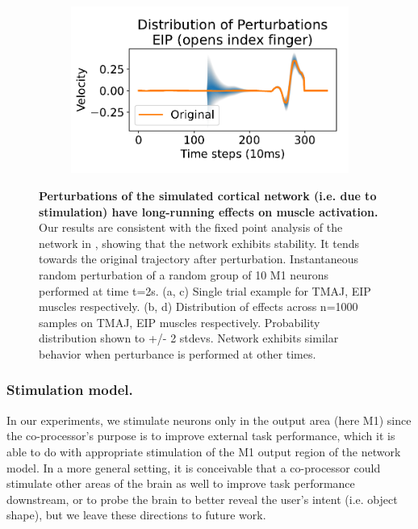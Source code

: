 \documentclass[12pt]{iopart}
\begin{document}
\begin{figure}[h]
\begin{subfigure}[c]{0.48\textwidth}
	    \caption{}
	\end{subfigure}
	\hfill
	\begin{subfigure}[c]{0.48\textwidth}
	    \centering
	    \includegraphics[width=\textwidth]{perturbe_dist_eip.pdf}
	    \caption{}
	\end{subfigure}
	\hfill
	\caption{\textbf{Perturbations of the simulated cortical network (i.e. due to stimulation)
	         have long-running effects on muscle activation.} Our results are consistent with
	         the fixed point analysis of the network in \cite{michaels.mrnn}, showing that the network
	         exhibits stability. It tends towards the original trajectory after perturbation.
	         Instantaneous random perturbation of a random group of 10 M1
	         neurons performed at time t=2s. (a, c) Single trial example for TMAJ, EIP muscles
	         respectively. (b, d) Distribution of effects across n=1000 samples on TMAJ, EIP muscles
	         respectively. Probability distribution shown to +/- 2 stdevs. Network exhibits similar
	         behavior when perturbance is performed at other times.}
	\label{fig:dynamics}
\end{figure}

\subsubsection{Stimulation model.}
In our experiments, we stimulate neurons only in the output area (here M1) since the co-processor's
purpose is to improve external task performance, which it is able to do with
appropriate stimulation of the M1 output region of the network model. In a more general setting, it is
conceivable that a co-processor could stimulate other areas of the brain as well to improve task
performance downstream, or to probe the brain to better reveal the user's intent (i.e. object
shape), but we leave these directions to future work.
\end{document}
